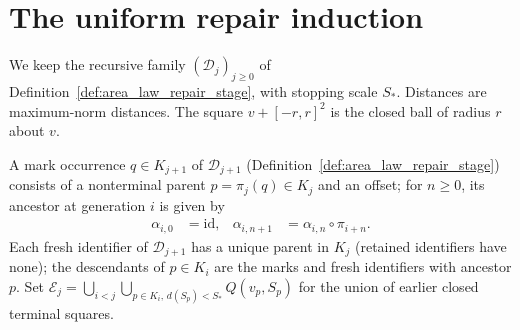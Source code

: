 \section{The uniform repair induction}
\label{sec:area_law_repair_induction}

We keep the recursive family $(\mathcal D_j)_{j\ge0}$ of
Definition~\ref{def:area_law_repair_stage}, with stopping scale $S_*$.
Distances are maximum-norm distances. The square
$v+[-r,r]^2$ is the closed ball of radius $r$ about $v$.

\begin{definition}
    \label{def:area_law_repair_ancestors}
    \leanok
    A mark occurrence $q\in K_{j+1}$ of $\mathcal D_{j+1}$ (Definition~\ref{def:area_law_repair_stage})
    consists of a nonterminal parent $p=\pi_j(q)\in K_j$ and an offset; for $n\ge0$, its ancestor at
    generation $i$ is given by
    \begin{align}
        \alpha_{i,0} & =\mathrm{id},
                     & \alpha_{i,n+1} & =\alpha_{i,n}\circ\pi_{i+n}.
        \label{eq:area_law_repair_ancestor_map}
    \end{align}
    Each fresh identifier of $\mathcal D_{j+1}$ has a unique parent in $K_j$ (retained identifiers
    have none); the descendants of $p\in K_i$ are the marks and fresh identifiers with ancestor $p$.
    Set $\mathcal E_j=\bigcup_{i<j}\bigcup_{p\in K_i,\,d(S_p)<S_*}Q(v_p,S_p)$ for the union of earlier
    closed terminal squares.
\end{definition}

